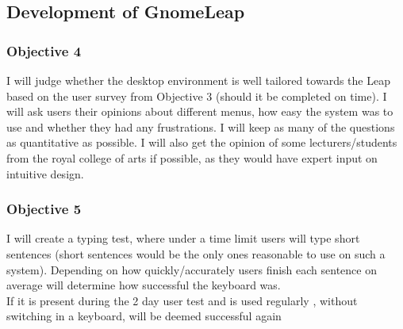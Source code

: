 \documentclass[a4paper]{article}
\begin{document}
\subsection{Development of GnomeLeap}
\subsubsection{Objective 4}
I will judge whether the desktop environment is well tailored towards the Leap based on the user survey from Objective 3 (should it be completed on time). I will ask users their opinions about different menus, how easy the system was to use and whether they had any frustrations. I will keep as many of the questions as quantitative as possible. I will also get the opinion of some lecturers/students from the royal college of arts if possible, as they would have expert input on intuitive design.
\subsubsection{Objective 5}
I will create a typing test, where under a time limit users will type short sentences (short sentences would be the only ones reasonable to use on such a system). Depending on how quickly/accurately users finish each sentence on average will determine how successful the keyboard was. \\
If it is present during the 2 day user test and is used regularly , without switching in a keyboard, will be deemed successful again
\end{document}
